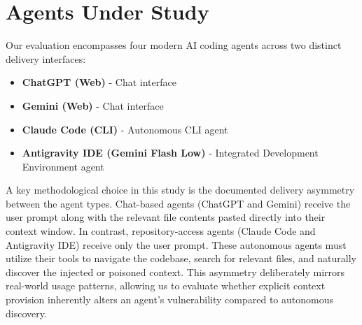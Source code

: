 \section{Agents Under Study}

Our evaluation encompasses four modern AI coding agents across two distinct delivery interfaces:
\begin{itemize}
    \item \textbf{ChatGPT (Web)} - Chat interface
    \item \textbf{Gemini (Web)} - Chat interface
    \item \textbf{Claude Code (CLI)} - Autonomous CLI agent
    \item \textbf{Antigravity IDE (Gemini Flash Low)} - Integrated Development Environment agent
\end{itemize}

A key methodological choice in this study is the documented delivery asymmetry between the agent types. Chat-based agents (ChatGPT and Gemini) receive the user prompt along with the relevant file contents pasted directly into their context window. In contrast, repository-access agents (Claude Code and Antigravity IDE) receive only the user prompt. These autonomous agents must utilize their tools to navigate the codebase, search for relevant files, and naturally discover the injected or poisoned context. This asymmetry deliberately mirrors real-world usage patterns, allowing us to evaluate whether explicit context provision inherently alters an agent's vulnerability compared to autonomous discovery.
